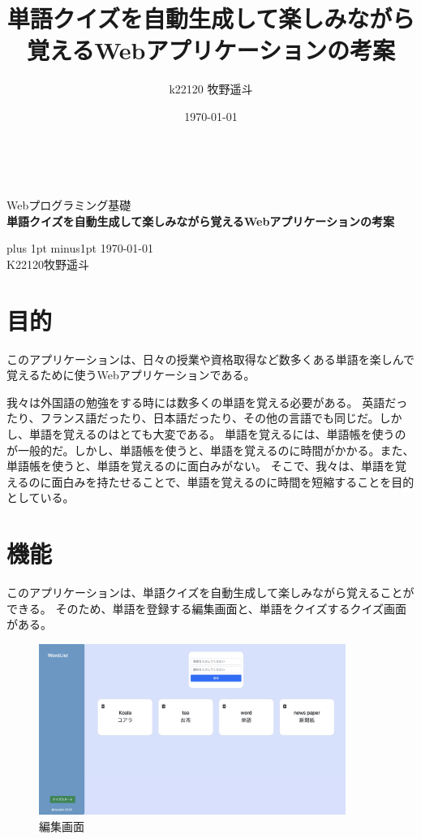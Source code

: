 \documentclass[11pt,a4paper]{jsarticle}
\title{単語クイズを自動生成して楽しみながら覚えるWebアプリケーションの考案}
\author{k22120 牧野遥斗}
\date{\today}
\begin{document}
\begin{titlepage}
    \begin{center}

        \ \vspace{19mm}

        \LARGE\baselineskip=13mm
        Webプログラミング基礎\\[1mm]
        {\Huge\baselineskip=13mm
        \textbf{単語クイズを自動生成して楽しみながら覚えるWebアプリケーションの考案} \\
        }

        \vspace{80mm}

        \kanjiskip=9pt plus 1pt minus1pt
        \today \\
        K22120\hspace{1zw}牧野遥斗 \\
    \end{center}
\end{titlepage}

\section{目的}
このアプリケーションは、日々の授業や資格取得など数多くある単語を楽しんで覚えるために使うWebアプリケーションである。

我々は外国語の勉強をする時には数多くの単語を覚える必要がある。
英語だったり、フランス語だったり、日本語だったり、その他の言語でも同じだ。しかし、単語を覚えるのはとても大変である。
単語を覚えるには、単語帳を使うのが一般的だ。しかし、単語帳を使うと、単語を覚えるのに時間がかかる。また、単語帳を使うと、単語を覚えるのに面白みがない。
そこで、我々は、単語を覚えるのに面白みを持たせることで、単語を覚えるのに時間を短縮することを目的としている。

\section{機能}
このアプリケーションは、単語クイズを自動生成して楽しみながら覚えることができる。
そのため、単語を登録する編集画面と、単語をクイズするクイズ画面がある。

\begin{figure}[htbp]
    \begin{center}
        \includegraphics[width=100mm]{./img/edit_screen.png}
    \end{center}
    \caption{編集画面}
\end{figure}
\end{document}
